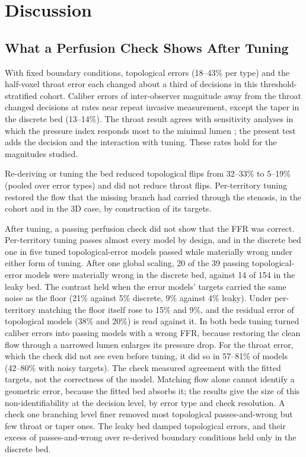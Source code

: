\documentclass[journal,twoside,web]{ieeecolor}
\begin{document}
\section{Discussion}
\subsection{What a Perfusion Check Shows After Tuning}
With fixed boundary conditions, topological errors (18--43\% per type) and the half-voxel throat error each changed about a third of decisions in this threshold-stratified cohort. Caliber errors of inter-observer magnitude away from the throat changed decisions at rates near repeat invasive measurement, except the taper in the discrete bed (13--14\%). The throat result agrees with sensitivity analyses in which the pressure index responds most to the minimal lumen \cite{sankaran2015tmi,fernandez2024}; the present test adds the decision and the interaction with tuning. These rates hold for the magnitudes studied.

Re-deriving or tuning the bed reduced topological flips from 32--33\% to 5--19\% (pooled over error types) and did not reduce throat flips. Per-territory
tuning restored the flow that the missing branch had carried through the stenosis, in the cohort and in the 3D case, by construction of its targets.

After tuning, a passing perfusion check did not show that the FFR was correct. Per-territory tuning passes
almost every model by design, and in the discrete bed one in five tuned topological-error models passed while
materially wrong under either form of tuning. After one global scaling, 20 of the 39 passing topological-error models were materially wrong in the discrete bed, against 14 of 154 in the leaky bed. The contrast held when the error models' targets carried the same noise as the floor (21\% against 5\% discrete, 9\% against 4\% leaky). Under per-territory matching the floor itself rose to 15\% and 9\%, and the residual error of topological models (38\% and 20\%) is read against it. In both beds tuning turned caliber errors into passing models with a wrong FFR, because restoring the clean flow through a narrowed lumen enlarges its pressure drop. For the throat error, which the check did not see even before tuning, it did so in 57--81\% of models (42--80\% with noisy targets). The check measured agreement with the fitted targets, not the correctness of the model. Matching flow alone cannot
identify a geometric error, because the fitted bed absorbs it; the results give the size of this non-identifiability at the decision level, by error type and check resolution. A check one
branching level finer removed most topological passes-and-wrong but few throat or taper ones. The leaky
bed damped topological errors, and their excess of passes-and-wrong over re-derived boundary conditions held only in
the discrete bed.
\end{document}
